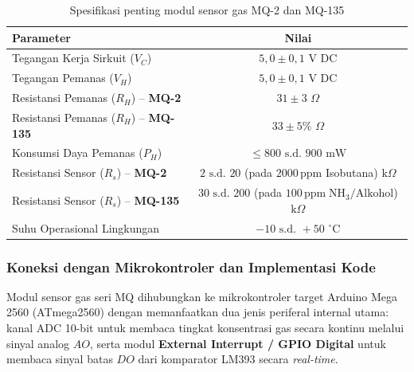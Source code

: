\begin{table}[H]
	\centering
	\caption{Spesifikasi penting modul sensor gas MQ-2 dan MQ-135}
	\label{tab:mq_spesifikasi}
	\small
	\begin{tabularx}{\textwidth}{@{}Xc@{}}
		\toprule
		Parameter                                     & Nilai                                                                                      \\
		\midrule
		Tegangan Kerja Sirkuit ($V_C$)                & $5{,}0 \pm 0{,}1$ $\text{V DC}$                                                            \\
		Tegangan Pemanas ($V_H$)                      & $5{,}0 \pm 0{,}1$ $\text{V DC}$                                                            \\
		Resistansi Pemanas ($R_H$) -- \textbf{MQ-2}   & $31 \pm 3$ $\Omega$                                                                        \\
		Resistansi Pemanas ($R_H$) -- \textbf{MQ-135} & $33 \pm 5\%$ $\Omega$                                                                      \\
		Konsumsi Daya Pemanas ($P_H$)                 & $\le 800 \text{ s.d. } 900$ $\text{mW}$                                                        \\
		Resistansi Sensor ($R_s$) -- \textbf{MQ-2}    & $2 \text{ s.d. } 20$ (pada $2000\,\text{ppm}$ Isobutana) $\text{k}\Omega$                      \\
		Resistansi Sensor ($R_s$) -- \textbf{MQ-135}  & $30 \text{ s.d. } 200$ (pada $100\,\text{ppm} \; \text{NH}_3/\text{Alkohol}$) $\text{k}\Omega$ \\
		Suhu Operasional Lingkungan                   & $-10 \text{ s.d. } +50$ $^\circ\text{C}$                                                   \\
		\bottomrule
	\end{tabularx}
\end{table}

\subsubsection{Koneksi dengan Mikrokontroler dan Implementasi Kode}
Modul sensor gas seri MQ dihubungkan ke mikrokontroler target Arduino Mega 2560 (ATmega2560) dengan memanfaatkan dua jenis periferal internal utama: kanal ADC  10-bit untuk membaca tingkat konsentrasi gas secara kontinu melalui sinyal analog $AO$, serta modul \textbf{External Interrupt / GPIO Digital} untuk membaca sinyal batas $DO$ dari komparator LM393 secara \textit{real-time}.

